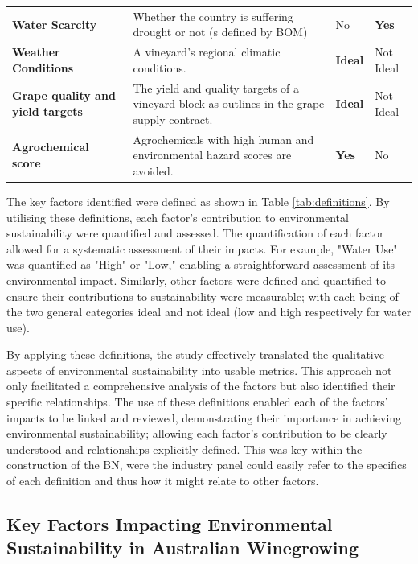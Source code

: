 \begin{table}[h]
\begin{tabular}{@{}llll@{}}
    \textbf{Water Scarcity} & Whether the country is suffering drought or not (s defined by BOM) & No & \textbf{Yes} \\
    \textbf{Weather Conditions} & A vineyard’s regional climatic conditions. & \textbf{Ideal} & Not Ideal \\
    \textbf{Grape quality and yield targets} & The yield and quality targets of a vineyard block as outlines in the grape supply contract. & \textbf{Ideal} & Not Ideal \\
    \textbf{Agrochemical score} & Agrochemicals with high human and environmental hazard scores are avoided. & \textbf{Yes} & No \\ \bottomrule
    \end{tabular}
\end{table}

The key factors identified were defined as shown in Table \ref{tab:definitions}. By utilising these definitions, each factor's contribution to environmental sustainability were quantified and assessed. The quantification of each factor allowed for a systematic assessment of their impacts. For example, "Water Use" was quantified as "High" or "Low," enabling a straightforward assessment of its environmental impact. Similarly, other factors were defined and quantified to ensure their contributions to sustainability were measurable; with each being of the two general categories ideal and not ideal (low and high respectively for water use).

By applying these definitions, the study effectively translated the qualitative aspects of environmental sustainability into usable metrics. This approach not only facilitated a comprehensive analysis of the factors but also identified their specific relationships. The use of these definitions enabled each of the factors' impacts to be linked and reviewed, demonstrating their importance in achieving environmental sustainability; allowing each factor's contribution to be clearly understood and relationships explicitly defined. This was key within the construction of the BN, were the industry panel could easily refer to the specifics of each definition and thus how it might relate to other factors.

\subsection{Key Factors Impacting Environmental Sustainability in Australian Winegrowing}


